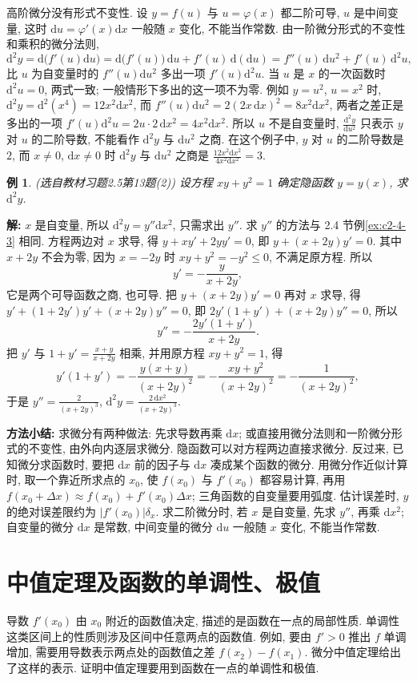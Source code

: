 \documentclass[UTF8,openany]{ctexbook}
\theoremstyle{chinesetextbook}
\newtheorem{example}{例}[section]
\newenvironment{cnsolution}{\par\indent\textbf{解:} \ignorespaces}{\par}
\newcommand{\dd}{\mathrm d}
\begin{document}
高阶微分没有形式不变性. 设 $y=f(u)$ 与 $u=\varphi(x)$ 都二阶可导, $u$ 是中间变量, 这时 $\dd u=\varphi'(x)\dd x$ 一般随 $x$ 变化, 不能当作常数. 由一阶微分形式的不变性和乘积的微分法则,
\[
\dd^2y=\dd\bigl(f'(u)\dd u\bigr)=\dd\bigl(f'(u)\bigr)\,\dd u+f'(u)\,\dd(\dd u)=f''(u)\,\dd u^2+f'(u)\,\dd^2u,
\]
比 $u$ 为自变量时的 $f''(u)\dd u^2$ 多出一项 $f'(u)\dd^2u$. 当 $u$ 是 $x$ 的一次函数时 $\dd^2u=0$, 两式一致; 一般情形下多出的这一项不为零. 例如 $y=u^2$, $u=x^2$ 时, $\dd^2y=\dd^2(x^4)=12x^2\dd x^2$, 而 $f''(u)\dd u^2=2(2x\,\dd x)^2=8x^2\dd x^2$, 两者之差正是多出的一项 $f'(u)\dd^2u=2u\cdot2\,\dd x^2=4x^2\dd x^2$. 所以 $u$ 不是自变量时, $\displaystyle\frac{\dd^2y}{\dd u^2}$ 只表示 $y$ 对 $u$ 的二阶导数, 不能看作 $\dd^2y$ 与 $\dd u^2$ 之商. 在这个例子中, $y$ 对 $u$ 的二阶导数是 $2$, 而 $x\ne0$, $\dd x\ne0$ 时 $\dd^2y$ 与 $\dd u^2$ 之商是 $\displaystyle\frac{12x^2\dd x^2}{4x^2\dd x^2}=3$.
\begin{example}\label{ex:c2-h5-13}
\textnormal{(选自教材习题2.5第13题(2))} 设方程 $xy+y^2=1$ 确定隐函数 $y=y(x)$, 求 $\dd^2y$.
\end{example}
\begin{cnsolution}
$x$ 是自变量, 所以 $\dd^2y=y''\dd x^2$, 只需求出 $y''$. 求 $y''$ 的方法与 2.4 节例\ref{ex:c2-4-3} 相同. 方程两边对 $x$ 求导, 得 $y+xy'+2yy'=0$, 即 $y+(x+2y)y'=0$. 其中 $x+2y$ 不会为零, 因为 $x=-2y$ 时 $xy+y^2=-y^2\le0$, 不满足原方程. 所以
\[
y'=-\frac y{x+2y},
\]
它是两个可导函数之商, 也可导. 把 $y+(x+2y)y'=0$ 再对 $x$ 求导, 得 $y'+(1+2y')y'+(x+2y)y''=0$, 即 $2y'(1+y')+(x+2y)y''=0$, 所以
\[
y''=-\frac{2y'(1+y')}{x+2y}.
\]
把 $y'$ 与 $\displaystyle1+y'=\frac{x+y}{x+2y}$ 相乘, 并用原方程 $xy+y^2=1$, 得
\[
y'(1+y')=-\frac{y(x+y)}{(x+2y)^2}=-\frac{xy+y^2}{(x+2y)^2}=-\frac1{(x+2y)^2},
\]
于是 $\displaystyle y''=\frac2{(x+2y)^3}$, $\displaystyle\dd^2y=\frac{2\,\dd x^2}{(x+2y)^3}$.
\end{cnsolution}
\par\indent\textbf{方法小结:} 求微分有两种做法: 先求导数再乘 $\dd x$; 或直接用微分法则和一阶微分形式的不变性, 由外向内逐层求微分. 隐函数可以对方程两边直接求微分. 反过来, 已知微分求函数时, 要把 $\dd x$ 前的因子与 $\dd x$ 凑成某个函数的微分. 用微分作近似计算时, 取一个靠近所求点的 $x_0$, 使 $f(x_0)$ 与 $f'(x_0)$ 都容易计算, 再用 $f(x_0+\Delta x)\approx f(x_0)+f'(x_0)\Delta x$; 三角函数的自变量要用弧度. 估计误差时, $y$ 的绝对误差限约为 $|f'(x_0)|\delta_x$. 求二阶微分时, 若 $x$ 是自变量, 先求 $y''$, 再乘 $\dd x^2$; 自变量的微分 $\dd x$ 是常数, 中间变量的微分 $\dd u$ 一般随 $x$ 变化, 不能当作常数.
\section{中值定理及函数的单调性、极值}
导数 $f'(x_0)$ 由 $x_0$ 附近的函数值决定, 描述的是函数在一点的局部性质. 单调性这类区间上的性质则涉及区间中任意两点的函数值. 例如, 要由 $f'>0$ 推出 $f$ 单调增加, 需要用导数表示两点处的函数值之差 $f(x_2)-f(x_1)$. 微分中值定理给出了这样的表示. 证明中值定理要用到函数在一点的单调性和极值.
\end{document}
